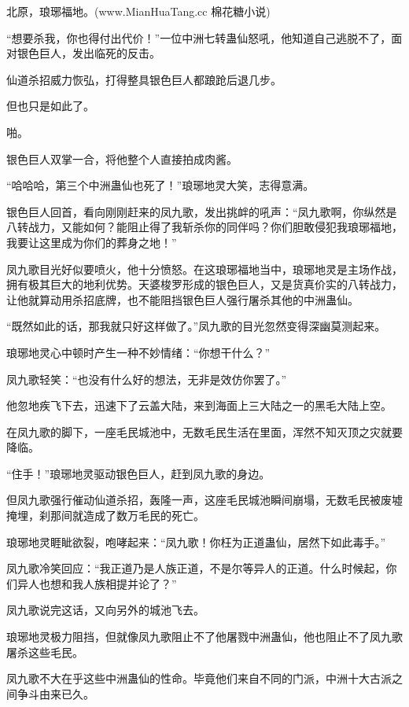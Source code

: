 
\begin{this_body}

北原，琅琊福地。(www.MianHuaTang.cc 棉花糖小说)

“想要杀我，你也得付出代价！”一位中洲七转蛊仙怒吼，他知道自己逃脱不了，面对银色巨人，发出临死的反击。

仙道杀招威力恢弘，打得整具银色巨人都踉跄后退几步。

但也只是如此了。

啪。

银色巨人双掌一合，将他整个人直接拍成肉酱。

“哈哈哈，第三个中洲蛊仙也死了！”琅琊地灵大笑，志得意满。

银色巨人回首，看向刚刚赶来的凤九歌，发出挑衅的吼声：“凤九歌啊，你纵然是八转战力，又能如何？能阻止得了我斩杀你的同伴吗？你们胆敢侵犯我琅琊福地，我要让这里成为你们的葬身之地！”

凤九歌目光好似要喷火，他十分愤怒。在这琅琊福地当中，琅琊地灵是主场作战，拥有极其巨大的地利优势。天婆梭罗形成的银色巨人，又是货真价实的八转战力，让他就算动用杀招底牌，也不能阻挡银色巨人强行屠杀其他的中洲蛊仙。

“既然如此的话，那我就只好这样做了。”凤九歌的目光忽然变得深幽莫测起来。

琅琊地灵心中顿时产生一种不妙情绪：“你想干什么？”

凤九歌轻笑：“也没有什么好的想法，无非是效仿你罢了。”

他忽地疾飞下去，迅速下了云盖大陆，来到海面上三大陆之一的黑毛大陆上空。

在凤九歌的脚下，一座毛民城池中，无数毛民生活在里面，浑然不知灭顶之灾就要降临。

“住手！”琅琊地灵驱动银色巨人，赶到凤九歌的身边。

但凤九歌强行催动仙道杀招，轰隆一声，这座毛民城池瞬间崩塌，无数毛民被废墟掩埋，刹那间就造成了数万毛民的死亡。

琅琊地灵睚眦欲裂，咆哮起来：“凤九歌！你枉为正道蛊仙，居然下如此毒手。”

凤九歌冷笑回应：“我正道乃是人族正道，不是尔等异人的正道。什么时候起，你们异人也想和我人族相提并论了？”

凤九歌说完这话，又向另外的城池飞去。

琅琊地灵极力阻挡，但就像凤九歌阻止不了他屠戮中洲蛊仙，他也阻止不了凤九歌屠杀这些毛民。

凤九歌不大在乎这些中洲蛊仙的性命。毕竟他们来自不同的门派，中洲十大古派之间争斗由来已久。


\end{this_body}
